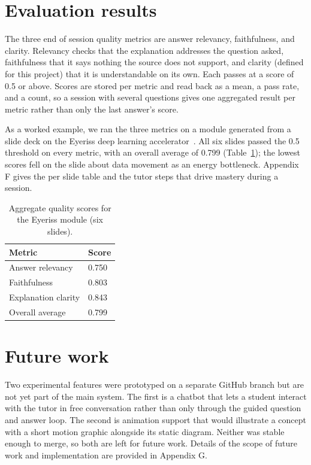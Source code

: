 \documentclass{ecai}
\begin{document}
\section{Evaluation results}
\label{sec:eval-results}

The three end of session quality metrics are answer relevancy, faithfulness, and
clarity. Relevancy checks that the explanation addresses the question asked,
faithfulness that it says nothing the source does not support, and clarity
(defined for this project) that it is understandable on its own. Each passes at a
score of 0.5 or above. Scores are stored per metric and read back as a mean, a
pass rate, and a count, so a session with several questions gives one aggregated
result per metric rather than only the last answer's score.

As a worked example, we ran the three metrics on a module generated from a slide
deck on the Eyeriss deep learning accelerator~\cite{chen2016eyeriss}. All six
slides passed the 0.5 threshold on every metric, with an overall average of
0.799 (Table~\ref{tab:eyeriss-agg}); the lowest scores fell on the slide about
data movement as an energy bottleneck. Appendix F gives the per slide table and
the tutor steps that drive mastery during a session.

\begin{table}[h]
\caption{Aggregate quality scores for the Eyeriss module (six slides).}
\label{tab:eyeriss-agg}
\centering
\small
\begin{tabular}{p{4.0cm}p{1.0cm}}
\toprule
\textbf{Metric} & \textbf{Score} \\
\midrule
Answer relevancy & 0.750 \\
Faithfulness & 0.803 \\
Explanation clarity & 0.843 \\
Overall average & 0.799 \\
\bottomrule
\end{tabular}
\end{table}

\section{Future work}

Two experimental features were prototyped on a separate GitHub branch but are
not yet part of the main system. The first is a chatbot that lets a student
interact with the tutor in free conversation rather than only through the
guided question and answer loop. The second is animation support that would
illustrate a concept with a short motion graphic alongside its static diagram.
Neither was stable enough to merge, so both are left for future work.
Details of the scope of future work and implementation are provided in Appendix G.
\end{document}
